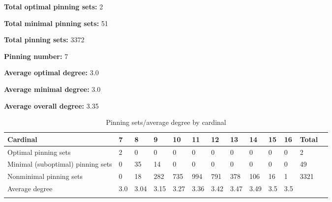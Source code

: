 \documentclass{article}%
\begin{document}
\begin{multicols}{2}
{\normalsize \noindent\textbf{Total optimal pinning sets:} 2

\noindent\textbf{Total minimal pinning sets:} 51

\noindent\textbf{Total pinning sets:} 3372

\noindent\textbf{Pinning number:} 7

}
\columnbreak

{\normalsize \noindent\textbf{Average optimal degree:} 3.0

\noindent\textbf{Average minimal degree:} 3.0

\noindent\textbf{Average overall degree:} 3.35

}
\end{multicols}

\begin{table}[ht]
	\caption{Pinning sets/average degree by cardinal}
	\centering
	\renewcommand{\arraystretch}{1.5}
	\begin{tabularx}{\textwidth}{lXXXXXXXXXXXX}
		\toprule
			Cardinal & 7 & 8 & 9 & 10 & 11 & 12 & 13 & 14 & 15 & 16 & Total\\
			\hline
			Optimal pinning sets & 2 & 0 & 0 & 0 & 0 & 0 & 0 & 0 & 0 & 0 & 2 \\
			Minimal (suboptimal) pinning sets & 0 & 35 & 14 & 0 & 0 & 0 & 0 & 0 & 0 & 0 & 49 \\
			Nonminimal pinning sets & 0 & 18 & 282 & 735 & 994 & 791 & 378 & 106 & 16 & 1 & 3321 \\
			Average degree & 3.0 & 3.04 & 3.15 & 3.27 & 3.36 & 3.42 & 3.47 & 3.49 & 3.5 & 3.5 &  \\
		\bottomrule \\ 
	\end{tabularx}
\end{table}
\end{document}
